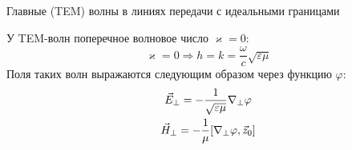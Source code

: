 \documentclass[a4paper,14pt]{extarticle}
\DeclareMathOperator{\Div}{div}
\begin{document}
\newpage
\hypertarget{num6}{}
Главные (TEM) волны в линиях передачи с идеальными границами

У TEM-волн поперечное волновое число $\varkappa=0$:
\begin{equation*}
\varkappa=0 \Rightarrow h=k= \frac{\omega}{c}\sqrt{\varepsilon \mu}
\end{equation*}
Поля таких волн выражаются следующим образом через функцию $\varphi$:
\begin{gather*}
\label{eperp}
\vec{E}_\perp=-\frac{1}{\sqrt{\varepsilon \mu}}\nabla_\perp \varphi\\
\vec{H}_\perp=-\frac{1}{\mu}\qty[\nabla_\perp \varphi,\vec{z}_0]
\end{gather*}

%
%
%
%
%
\end{document}

